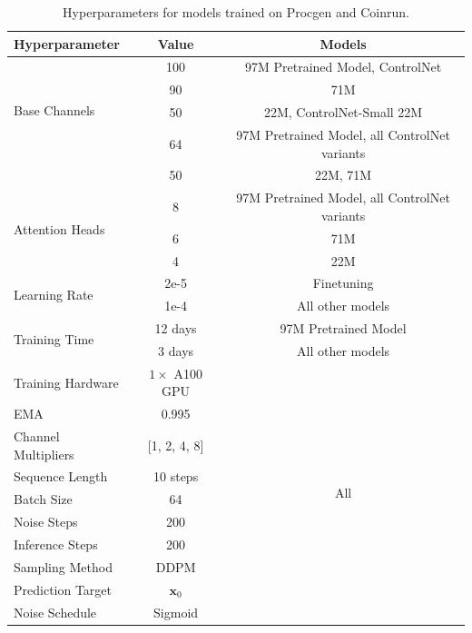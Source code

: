 \begin{table}[ht]
\small
\centering
\caption{Hyperparameters for models trained on Procgen and Coinrun.}
\vspace{1mm}
\label{tab:coinrun_hyperparameters}
\begin{tabular}{lcc}
\toprule
\textbf{Hyperparameter} & \textbf{Value} & \textbf{Models} \\
\midrule
\multirow{4}{3.5cm}{Base Channels} & 100 & 97M Pretrained Model, ControlNet \\
                        & 90 & 71M \\ 
                        & 50 & 22M, ControlNet-Small 22M \\ \hline
\multirow{3}{3.5cm}{Attention Head Dims} & 64 & 97M Pretrained Model, all ControlNet variants \\ \
                        & 50 & 22M, 71M\\ \hline
\multirow{3}{3.5cm}{Attention Heads} & 8 & 97M Pretrained Model, all ControlNet variants  \\ \
                        & 6 & 71M  \\
                        & 4 & 22M \\ \hline 
\multirow{2}{3.5cm}{Learning Rate}  & 2e-5 & Finetuning  \\
 & 1e-4 & All other models \\ \hline
\multirow{2}{3.5cm}{Training Time} & 12 days & 97M Pretrained Model  \\ 
& 3 days & All other models \\ \hline
Training Hardware & $1\times$ A100 GPU & \multirow{10}{0.1cm}{All} \\
EMA & 0.995 \\
Channel Multipliers & [1, 2, 4, 8] \\
Sequence Length & 10 steps \\
Batch Size & 64 \\
Noise Steps & 200 \\
Inference Steps & 200 \\
Sampling Method & DDPM \\
Prediction Target & $\mathbf{x}_0$ \\
Noise Schedule & Sigmoid \\
\bottomrule
\end{tabular}
\end{table}


